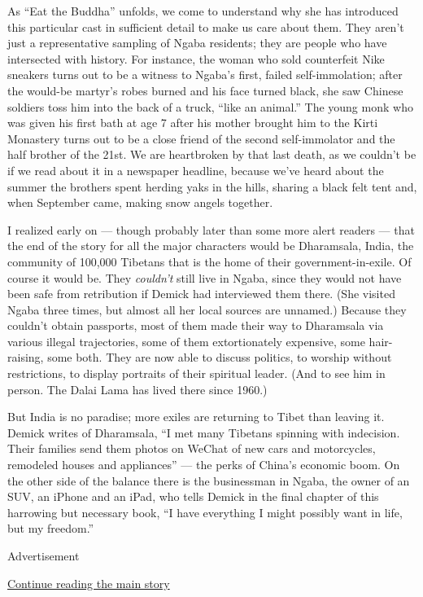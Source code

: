 As ``Eat the Buddha'' unfolds, we come to understand why she has
introduced this particular cast in sufficient detail to make us care
about them. They aren't just a representative sampling of Ngaba
residents; they are people who have intersected with history. For
instance, the woman who sold counterfeit Nike sneakers turns out to be a
witness to Ngaba's first, failed self-immolation; after the would-be
martyr's robes burned and his face turned black, she saw Chinese
soldiers toss him into the back of a truck, ``like an animal.'' The
young monk who was given his first bath at age 7 after his mother
brought him to the Kirti Monastery turns out to be a close friend of the
second self-immolator and the half brother of the 21st. We are
heartbroken by that last death, as we couldn't be if we read about it in
a newspaper headline, because we've heard about the summer the brothers
spent herding yaks in the hills, sharing a black felt tent and, when
September came, making snow angels together.

I realized early on --- though probably later than some more alert
readers --- that the end of the story for all the major characters would
be Dharamsala, India, the community of 100,000 Tibetans that is the home
of their government-in-exile. Of course it would be. They
\emph{couldn't} still live in Ngaba, since they would not have been safe
from retribution if Demick had interviewed them there. (She visited
Ngaba three times, but almost all her local sources are unnamed.)
Because they couldn't obtain passports, most of them made their way to
Dharamsala via various illegal trajectories, some of them extortionately
expensive, some hair-raising, some both. They are now able to discuss
politics, to worship without restrictions, to display portraits of their
spiritual leader. (And to see him in person. The Dalai Lama has lived
there since 1960.)

But India is no paradise; more exiles are returning to Tibet than
leaving it. Demick writes of Dharamsala, ``I met many Tibetans spinning
with indecision. Their families send them photos on WeChat of new cars
and motorcycles, remodeled houses and appliances'' --- the perks of
China's economic boom. On the other side of the balance there is the
businessman in Ngaba, the owner of an SUV, an iPhone and an iPad, who
tells Demick in the final chapter of this harrowing but necessary book,
``I have everything I might possibly want in life, but my freedom.''

Advertisement

\protect\hyperlink{after-bottom}{Continue reading the main story}

